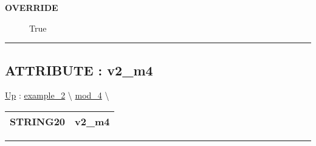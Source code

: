 \par
\begin{description}
\item [\textbf{OVERRIDE}] True
\end{description}

\rule{\linewidth}{0.5pt}
\subsection*{ATTRIBUTE : v2\_m4}
\hypertarget{ecldoc:intest.example_2.mod_4.v2_m4}{}
\hyperlink{ecldoc:intest.example_2.mod_4}{Up} :
\hspace{0pt} \hyperlink{ecldoc:intest.example_2}{example_2} \textbackslash 
\hspace{0pt} \hyperlink{ecldoc:intest.example_2.mod_4}{mod_4} \textbackslash 

{\renewcommand{\arraystretch}{1.5}
\begin{tabularx}{\textwidth}{|>{\raggedright\arraybackslash}l|X|}
\hline
\hspace{0pt}STRING20 & v2\_m4 \\
\hline
\end{tabularx}
}

\par


\rule{\linewidth}{0.5pt}




